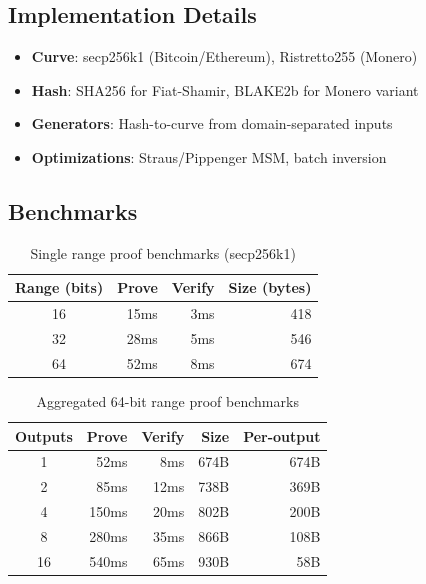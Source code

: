 \documentclass[11pt,a4paper]{article}
\begin{document}
\subsection{Implementation Details}

\begin{itemize}
    \item \textbf{Curve}: secp256k1 (Bitcoin/Ethereum), Ristretto255 (Monero)
    \item \textbf{Hash}: SHA256 for Fiat-Shamir, BLAKE2b for Monero variant
    \item \textbf{Generators}: Hash-to-curve from domain-separated inputs
    \item \textbf{Optimizations}: Straus/Pippenger MSM, batch inversion
\end{itemize}

\subsection{Benchmarks}

\begin{table}[h]
\centering
\begin{tabular}{crrr}
\toprule
\textbf{Range (bits)} & \textbf{Prove} & \textbf{Verify} & \textbf{Size (bytes)} \\
\midrule
16 & 15ms & 3ms & 418 \\
32 & 28ms & 5ms & 546 \\
64 & 52ms & 8ms & 674 \\
\bottomrule
\end{tabular}
\caption{Single range proof benchmarks (secp256k1)}
\label{tab:single-bench}
\end{table}

\begin{table}[h]
\centering
\begin{tabular}{crrrr}
\toprule
\textbf{Outputs} & \textbf{Prove} & \textbf{Verify} & \textbf{Size} & \textbf{Per-output} \\
\midrule
1 & 52ms & 8ms & 674B & 674B \\
2 & 85ms & 12ms & 738B & 369B \\
4 & 150ms & 20ms & 802B & 200B \\
8 & 280ms & 35ms & 866B & 108B \\
16 & 540ms & 65ms & 930B & 58B \\
\bottomrule
\end{tabular}
\caption{Aggregated 64-bit range proof benchmarks}
\label{tab:agg-bench}
\end{table}
\end{document}
